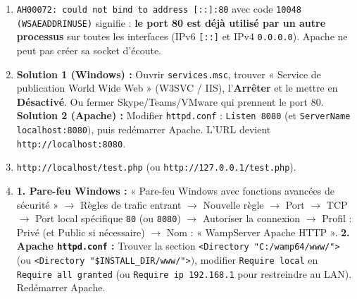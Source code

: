 \documentclass[11pt]{article}
\begin{document}
\begin{corrige}
\begin{enumerate}
\item \texttt{AH00072: could not bind to address [::]:80} avec code \texttt{10048 (WSAEADDRINUSE)} signifie : \textbf{le port 80 est déjà utilisé par un autre processus} sur toutes les interfaces (IPv6 \texttt{[::]} et IPv4 \texttt{0.0.0.0}). Apache ne peut pas créer sa socket d'écoute.
\item \textbf{Solution 1 (Windows) :} Ouvrir \texttt{services.msc}, trouver « Service de publication World Wide Web » (W3SVC / IIS), l'\textbf{Arrêter} et le mettre en \textbf{Désactivé}. Ou fermer Skype/Teams/VMware qui prennent le port 80. \textbf{Solution 2 (Apache) :} Modifier \texttt{httpd.conf} : \texttt{Listen 8080} (et \texttt{ServerName localhost:8080}$)$, puis redémarrer Apache. L'URL devient \texttt{http://localhost:8080}.
\item \texttt{http://localhost/test.php} (ou \texttt{http://127.0.0.1/test.php}).
\item \textbf{1. Pare-feu Windows :} « Pare-feu Windows avec fonctions avancées de sécurité » $\rightarrow$ Règles de trafic entrant $\rightarrow$ Nouvelle règle $\rightarrow$ Port $\rightarrow$ TCP $\rightarrow$ Port local spécifique \texttt{80} (ou \texttt{8080}) $\rightarrow$ Autoriser la connexion $\rightarrow$ Profil : Privé (et Public si nécessaire) $\rightarrow$ Nom : « WampServer Apache HTTP ». \textbf{2. Apache \texttt{httpd.conf} :} Trouver la section \texttt{<Directory "C:/wamp64/www/">} (ou \texttt{<Directory "\${INSTALL\_DIR}/www/">}$)$, modifier \texttt{Require local} en \texttt{Require all granted} (ou \texttt{Require ip 192.168.1} pour restreindre au LAN). Redémarrer Apache.
\end{enumerate}
\end{corrige}
\end{document}
